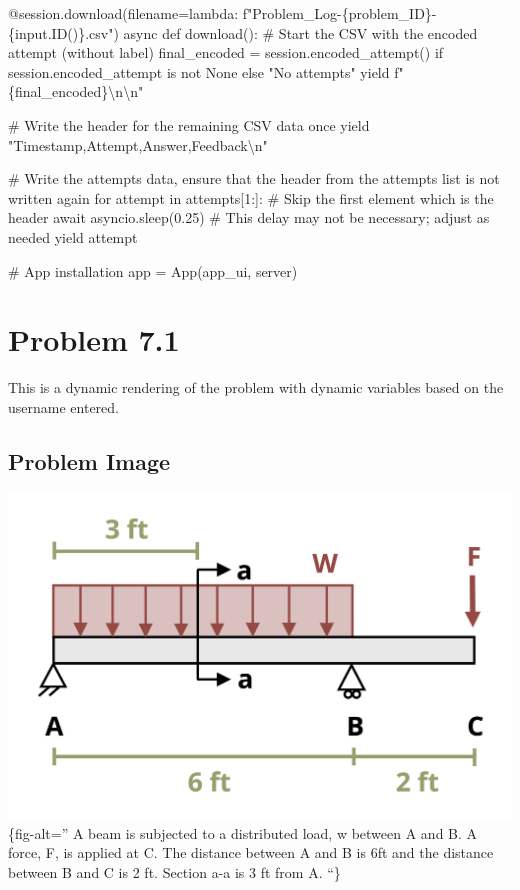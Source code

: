 \documentclass[
  letterpaper,
  DIV=11,
  numbers=noendperiod]{scrreprt}
\newenvironment{Shaded}{\begin{snugshade}}{\end{snugshade}}
\newcommand{\NormalTok}[1]{\textcolor[rgb]{0.00,0.23,0.31}{#1}}
\begin{document}
\begin{Shaded}
\begin{Highlighting}[]
\NormalTok{    @session.download(filename=lambda: f"Problem\_Log{-}\{problem\_ID\}{-}\{input.ID()\}.csv")}
\NormalTok{    async def download():}
\NormalTok{        \# Start the CSV with the encoded attempt (without label)}
\NormalTok{        final\_encoded = session.encoded\_attempt() if session.encoded\_attempt is not None else "No attempts"}
\NormalTok{        yield f"\{final\_encoded\}\textbackslash{}n\textbackslash{}n"}
        
\NormalTok{        \# Write the header for the remaining CSV data once}
\NormalTok{        yield "Timestamp,Attempt,Answer,Feedback\textbackslash{}n"}
        
\NormalTok{        \# Write the attempts data, ensure that the header from the attempts list is not written again}
\NormalTok{        for attempt in attempts[1:]:  \# Skip the first element which is the header}
\NormalTok{            await asyncio.sleep(0.25)  \# This delay may not be necessary; adjust as needed}
\NormalTok{            yield attempt}


\NormalTok{\# App installation}
\NormalTok{app = App(app\_ui, server)}
\end{Highlighting}
\end{Shaded}

\chapter*{Problem 7.1}\label{problem-7.1}


This is a dynamic rendering of the problem with dynamic variables based
on the username entered.

\section*{Problem Image}\label{problem-image-73}


\includegraphics{images/305.png}\{fig-alt='' A beam is subjected to a
distributed load, w between A and B. A force, F, is applied at C. The
distance between A and B is 6ft and the distance between B and C is 2
ft. Section a-a is 3 ft from A. ``\}
\end{document}

